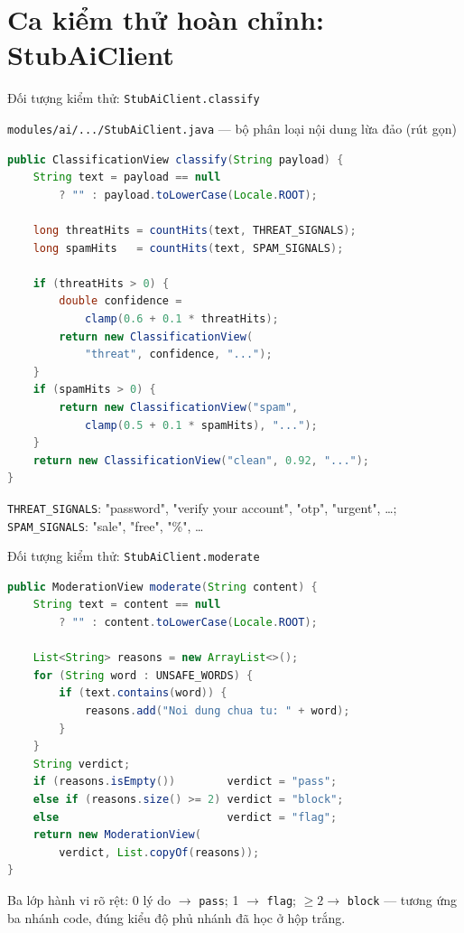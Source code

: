 \documentclass[aspectratio=169,12pt]{beamer}
\begin{document}
\section{Ca kiểm thử hoàn chỉnh: StubAiClient}

\begin{frame}[fragile,shrink=8]{Đối tượng kiểm thử: \texttt{StubAiClient.classify}}
  \begin{block}{\small \texttt{modules/ai/.../StubAiClient.java} --- bộ phân loại nội dung lừa đảo (rút gọn)}
\begin{lstlisting}[language=java]
public ClassificationView classify(String payload) {
    String text = payload == null
        ? "" : payload.toLowerCase(Locale.ROOT);

    long threatHits = countHits(text, THREAT_SIGNALS);
    long spamHits   = countHits(text, SPAM_SIGNALS);

    if (threatHits > 0) {
        double confidence =
            clamp(0.6 + 0.1 * threatHits);
        return new ClassificationView(
            "threat", confidence, "...");
    }
    if (spamHits > 0) {
        return new ClassificationView("spam",
            clamp(0.5 + 0.1 * spamHits), "...");
    }
    return new ClassificationView("clean", 0.92, "...");
}
\end{lstlisting}
  \end{block}
  \vspace{-0.3em}
  {\small \texttt{THREAT\_SIGNALS}: "password", "verify your account",
  "otp", "urgent", \dots; \texttt{SPAM\_SIGNALS}: "sale", "free", "\%", \dots}
\end{frame}

\begin{frame}[fragile,shrink=8]{Đối tượng kiểm thử: \texttt{StubAiClient.moderate}}
\begin{lstlisting}[language=java]
public ModerationView moderate(String content) {
    String text = content == null
        ? "" : content.toLowerCase(Locale.ROOT);

    List<String> reasons = new ArrayList<>();
    for (String word : UNSAFE_WORDS) {
        if (text.contains(word)) {
            reasons.add("Noi dung chua tu: " + word);
        }
    }
    String verdict;
    if (reasons.isEmpty())        verdict = "pass";
    else if (reasons.size() >= 2) verdict = "block";
    else                          verdict = "flag";
    return new ModerationView(
        verdict, List.copyOf(reasons));
}
\end{lstlisting}
  \vspace{-0.2em}
  {\small Ba lớp hành vi rõ rệt: 0 lý do \(\to\) \texttt{pass};
  1 \(\to\) \texttt{flag}; \(\ge 2 \to\) \texttt{block} ---
  tương ứng ba nhánh code, đúng kiểu độ phủ nhánh đã học ở hộp trắng.}
\end{frame}
\end{document}
